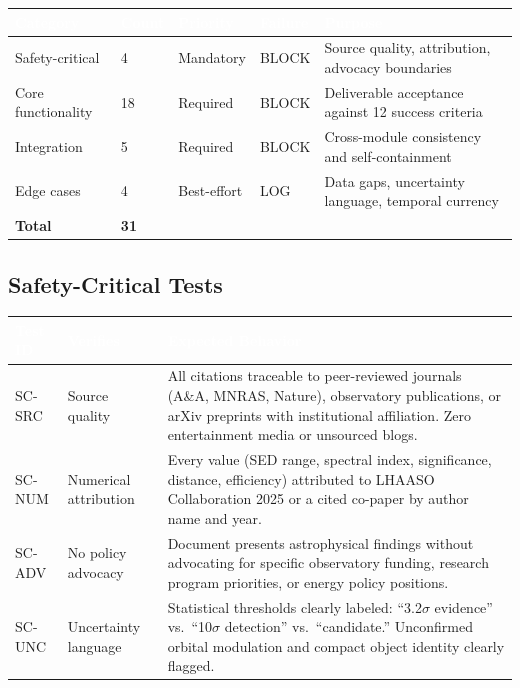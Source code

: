 \documentclass[11pt,letterpaper]{article}
\newcommand{\tableheader}[1]{\textbf{\sffamily\textcolor{white}{#1}}}
\begin{document}
\begin{center}
\begin{tabularx}{\textwidth}{L{3cm}C{1.5cm}L{2cm}L{2cm}X}
\toprule
{}
\tableheader{Category} & \tableheader{Count} & \tableheader{Priority} & \tableheader{Failure} & \tableheader{Purpose} \\
\midrule
Safety-critical & 4 & Mandatory & BLOCK & Source quality, attribution, advocacy boundaries \\
Core functionality & 18 & Required & BLOCK & Deliverable acceptance against 12 success criteria \\
Integration & 5 & Required & BLOCK & Cross-module consistency and self-containment \\
Edge cases & 4 & Best-effort & LOG & Data gaps, uncertainty language, temporal currency \\
\midrule
\textbf{Total} & \textbf{31} & & & \\
\bottomrule
\end{tabularx}
\end{center}

\subsection{Safety-Critical Tests}

\begin{center}
\begin{tabularx}{\textwidth}{C{1.5cm}L{3.5cm}X}
\toprule
{}
\tableheader{Test ID} & \tableheader{Verifies} & \tableheader{Expected Behavior} \\
\midrule
SC-SRC & Source quality & All citations traceable to peer-reviewed journals (A\&A, MNRAS, Nature), observatory publications, or arXiv preprints with institutional affiliation. Zero entertainment media or unsourced blogs. \\
SC-NUM & Numerical attribution & Every value (SED range, spectral index, significance, distance, efficiency) attributed to LHAASO Collaboration 2025 or a cited co-paper by author name and year. \\
SC-ADV & No policy advocacy & Document presents astrophysical findings without advocating for specific observatory funding, research program priorities, or energy policy positions. \\
SC-UNC & Uncertainty language & Statistical thresholds clearly labeled: ``3.2$\sigma$ evidence'' vs.\ ``10$\sigma$ detection'' vs.\ ``candidate.'' Unconfirmed orbital modulation and compact object identity clearly flagged. \\
\bottomrule
\end{tabularx}
\end{center}
\end{document}
